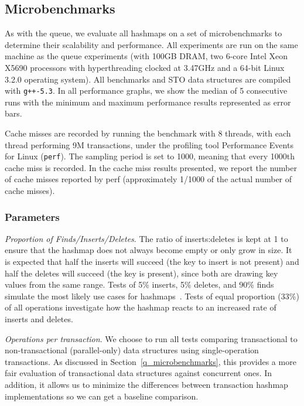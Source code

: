 \subsection{Microbenchmarks}
As with the queue, we evaluate all hashmaps on a set of microbenchmarks to determine their scalability and performance. All experiments are run on the same machine as the queue experiments (with 100GB DRAM, two 6-core Intel Xeon X5690 processors with hyperthreading clocked at 3.47GHz and a 64-bit Linux 3.2.0 operating system). All benchmarks and STO data structures are compiled with \texttt{g++-5.3}. In all performance graphs, we show the median of 5 consecutive runs with the minimum and maximum performance results represented as error bars.

Cache misses are recorded by running the benchmark with 8 threads, with each thread performing 9M transactions, under the profiling tool Performance Events for Linux (\texttt{perf}). The sampling period is set to 1000, meaning that every 1000th cache miss is recorded.
In the cache miss results presented, we report the number of cache misses reported by perf (approximately 1/1000 of the actual number of cache misses).

\subsubsection{Parameters}

    \emph{Proportion of Finds/Inserts/Deletes}. The ratio of inserts:deletes is kept at 1 to ensure that the hashmap does not always become empty or only grow in size. It is expected that half the inserts will succeed (the key to insert is not present) and half the deletes will succeed (the key is present), since both are drawing key values from the same range. Tests of 5\% inserts, 5\% deletes, and 90\% finds simulate the most likely use cases for hashmaps~\cite{hm1}. Tests of equal proportion (33\%) of all operations investigate how the hashmap reacts to an increased rate of inserts and deletes.

\emph{Operations per transaction}. We choose to run all tests comparing transactional to non-transactional (parallel-only) data structures using single-operation transactions. As discussed in Section~\ref{q_microbenchmarks}, this provides a more fair evaluation of transactional data structures against concurrent ones. In addition, it allows us to minimize the differences between transaction hashmap implementations so we can get a baseline comparison.

